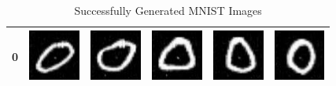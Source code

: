\begin{table}[H]
\begin{tabular}{|llllll|}
\end{tabular}
\end{table}

\begin{table}[ht]
\centering
\caption{Successfully Generated MNIST Images}
\label{MNIST-Result}
\begin{tabular}{|llllll|}
\hline
0 & \includegraphics[width=1.69cm, height=1.69cm]{Files/MNIST/0-0.png}  &\includegraphics[width=1.69cm,  height=1.69cm]{Files/MNIST/1-2.png}   & \includegraphics[width=1.69cm, height=1.69cm]{Files/MNIST/2-4.png}  & \includegraphics[width=1.69cm, height=1.69cm]{Files/MNIST/5-0.png}  & \includegraphics[width=1.69cm, height=1.69cm]{Files/MNIST/6-2.png} \\ \hline


\end{tabular}
\end{table}
